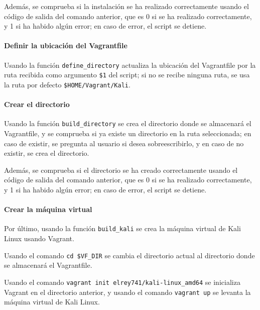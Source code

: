                 Además, se comprueba si la instalación se ha realizado correctamente usando el código de salida del comando anterior, que es 0 si se ha realizado correctamente, y 1 si ha habido algún error; en caso de error, el script se detiene.

            \paragraph{Definir la ubicación del Vagrantfile}
            
                Usando la función \texttt{define\_directory} actualiza la ubicación del Vagrantfile por la ruta recibida como argumento \texttt{\$1} del script; si no se recibe ninguna ruta, se usa la ruta por defecto \texttt{\$HOME/Vagrant/Kali}.

            \paragraph{Crear el directorio}

                Usando la función \texttt{build\_directory} se crea el directorio donde se almacenará el Vagrantfile, y se comprueba si ya existe un directorio en la ruta seleccionada; en caso de existir, se pregunta al usuario si desea sobreescribirlo, y en caso de no existir, se crea el directorio.

                Además, se comprueba si el directorio se ha creado correctamente usando el código de salida del comando anterior, que es 0 si se ha realizado correctamente, y 1 si ha habido algún error; en caso de error, el script se detiene.

            \paragraph{Crear la máquina virtual}
            
                Por último, usando la función \texttt{build\_kali} se crea la máquina virtual de Kali Linux usando Vagrant.

                Usando el comando \texttt{cd \$VF\_DIR} se cambia el directorio actual al directorio donde se almacenará el Vagrantfile.
                
                Usando el comando \texttt{vagrant init elrey741/kali-linux\_amd64} se inicializa Vagrant en el directorio anterior, y usando el comando \texttt{vagrant up} se levanta la máquina virtual de Kali Linux.

